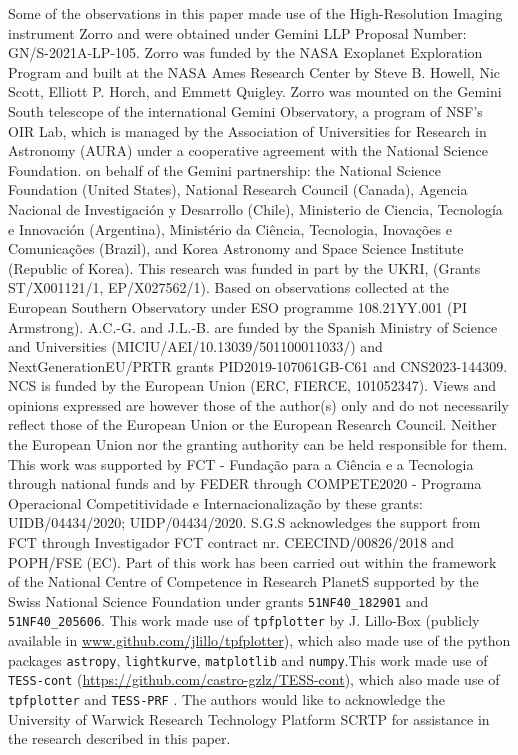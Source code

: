 \documentclass[fleqn,usenatbib,useAMS]{mnras}
\begin{document}
Some of the observations in this paper made use of the High-Resolution Imaging instrument Zorro and were obtained under Gemini LLP Proposal Number: GN/S-2021A-LP-105. Zorro was funded by the NASA Exoplanet Exploration Program and built at the NASA Ames Research Center by Steve B. Howell, Nic Scott, Elliott P. Horch, and Emmett Quigley. Zorro was mounted on the Gemini South telescope of the international Gemini Observatory, a program of NSF’s OIR Lab, which is managed by the Association of Universities for Research in Astronomy (AURA) under a cooperative agreement with the National Science Foundation. on behalf of the Gemini partnership: the National Science Foundation (United States), National Research Council (Canada), Agencia Nacional de Investigación y Desarrollo (Chile), Ministerio de Ciencia, Tecnología e Innovación (Argentina), Ministério da Ciência, Tecnologia, Inovações e Comunicações (Brazil), and Korea Astronomy and Space Science Institute (Republic of Korea).
This research was funded in part by the UKRI, (Grants ST/X001121/1, EP/X027562/1). Based on observations collected at the European Southern Observatory under ESO programme 108.21YY.001 (PI Armstrong). 
A.C.-G. and J.L.-B. are funded by the Spanish Ministry of Science and Universities (MICIU/AEI/10.13039/501100011033/) and NextGenerationEU/PRTR grants PID2019-107061GB-C61 and CNS2023-144309.  
NCS is funded by the European Union (ERC, FIERCE, 101052347). Views and opinions expressed are however those of the author(s) only and do not necessarily reflect those of the European Union or the European Research Council. Neither the European Union nor the granting authority can be held responsible for them. This work was supported by FCT - Fundação para a Ciência e a Tecnologia through national funds and by FEDER through COMPETE2020 - Programa Operacional Competitividade e Internacionalização by these grants: UIDB/04434/2020; UIDP/04434/2020.
S.G.S acknowledges the support from FCT through Investigador FCT contract nr. CEECIND/00826/2018 and POPH/FSE (EC).
Part of this work has been carried out within the framework of the National Centre of Competence in Research PlanetS supported by the Swiss National Science Foundation under grants \texttt{51NF40\_182901} and \texttt{51NF40\_205606}.
This work made use of \texttt{tpfplotter} by J. Lillo-Box (publicly available in \url{www.github.com/jlillo/tpfplotter}), which also made use of the python packages \texttt{astropy}, \texttt{lightkurve}, \texttt{matplotlib} and \texttt{numpy}.This work made use of \texttt{TESS-cont} (\url{https://github.com/castro-gzlz/TESS-cont}), which also made use of \texttt{tpfplotter} \citep{Aller2020} and \texttt{TESS-PRF} \citep{Bell2022}.
The authors would like to acknowledge the University of Warwick Research Technology Platform SCRTP for assistance in the research described in this paper.
\end{document}
